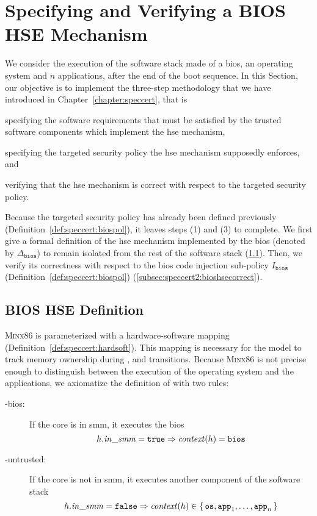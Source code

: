 \section{Specifying and Verifying a BIOS HSE Mechanism}
\label{sec:speccert2:verif}

We consider the execution of the software stack made of a \ac{bios}, an
operating system and \( n \) applications, after the end of the boot sequence.
%
In this Section, our objective is to implement the three-step methodology that
we have introduced in Chapter~\ref{chapter:speccert}, that is
%
\begin{inparaenum}[(1)]
\item specifying the software requirements that must be satisfied by the trusted
  software components which implement the \ac{hse} mechanism,
%
\item specifying the targeted security policy the \ac{hse} mechanism supposedly
  enforces, and
%
\item verifying that the \ac{hse} mechanism is correct with respect to the
  targeted security policy.
\end{inparaenum}

Because the targeted security policy has already been defined previously
(Definition~\ref{def:speccert:biospol}), it leaves steps (1) and (3) to
complete.
%
We first give a formal definition of the \ac{hse} mechanism implemented by the
\ac{bios} (denoted by \( \Delta_{\mathtt{bios}} \)) to remain isolated from the
rest of the software stack (\ref{subsec:speccert2:bioshsedef}).
%
Then, we verify its correctness with respect to the \ac{bios} code injection
sub-policy \( I_{\mathtt{bios}} \) (Definition~\ref{def:speccert:biospol})
(\ref{subsec:speccert2:bioshsecorrect}).

\subsection{BIOS HSE Definition}
\label{subsec:speccert2:bioshsedef}

{\scshape Minx86} is parameterized with a hardware-software mapping
 (Definition~\ref{def:speccert:hardsoft}).
%
This mapping is necessary for the model to track memory ownership during
,  and  transitions.
%
Because {\scshape Minx86} is not precise enough to distinguish between the
execution of the operating system and the applications, we axiomatize the
definition of  with two rules:
%
\begin{description}
\item [-bios:] If the core is in \ac{smm}, it executes the
  \ac{bios}
  \[
    h.\mathit{in\_smm} = \mathtt{true} \Rightarrow \mathit{context}(h) = \mathtt{bios}
  \]
\item [-untrusted:] If the core is not in \ac{smm}, it executes
  another component of the software stack
  \[
    h.\mathit{in\_smm} = \mathtt{false} \Rightarrow \mathit{context}(h) \in
    \{\,\mathtt{os}, \mathtt{app}_1, \dots, \mathtt{app}_n\,\}
  \]
\end{description}

